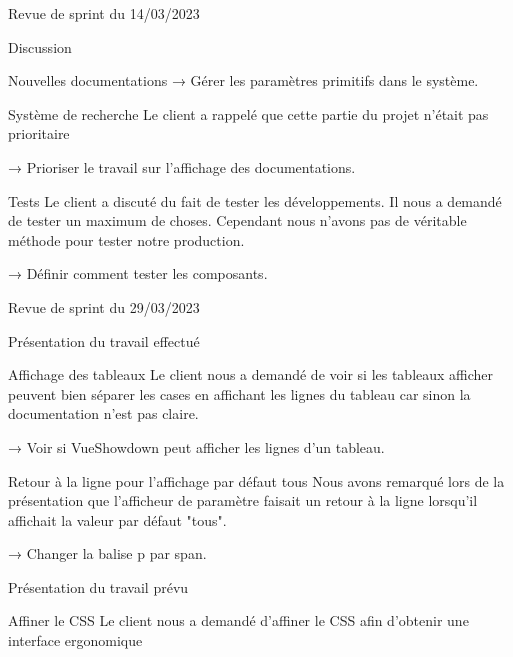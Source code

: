\documentclass[]{article}
\begin{document}
{\begin{section}{Revue de sprint du 14/03/2023}
\begin{subsection}{Discussion}
\begin{subsubsection}{Nouvelles documentations}
         → Gérer les paramètres primitifs dans le système.
     \end{subsubsection}

     \begin{subsubsection}{Système de recherche}
         Le client a rappelé que cette partie du projet n’était pas prioritaire

         → Prioriser le travail sur l’affichage des documentations.
     \end{subsubsection}

     \begin{subsubsection}{Tests}
         Le client a discuté du fait de tester les développements. Il nous a demandé de tester un maximum de choses. Cependant nous n’avons pas de véritable méthode pour tester notre production.

         → Définir comment tester les composants.
     \end{subsubsection}
 \end{subsection}
\end{section}

\begin{section}{Revue de sprint du 29/03/2023}
 \begin{subsection}{Présentation du travail effectué}
     \begin{subsubsection}{Affichage des tableaux}
         Le client nous a demandé de voir si les tableaux afficher peuvent bien séparer les cases en affichant les lignes du tableau car sinon la documentation n’est pas claire.

         → Voir si VueShowdown peut afficher les lignes d’un tableau.
     \end{subsubsection}

     \begin{subsubsection}{Retour à la ligne pour l’affichage par défaut tous}
         Nous avons remarqué lors de la présentation que l’afficheur de paramètre faisait un retour à la ligne lorsqu’il affichait la valeur par défaut "tous".

         → Changer la balise p par span.
     \end{subsubsection}
 \end{subsection}

 \newpage

 \begin{subsection}{Présentation du travail prévu}
     \begin{subsubsection}{Affiner le CSS}
         Le client nous a demandé d’affiner le CSS afin d’obtenir une interface ergonomique


\end{subsubsection}
\end{subsection}
\end{section}}
\end{document}
